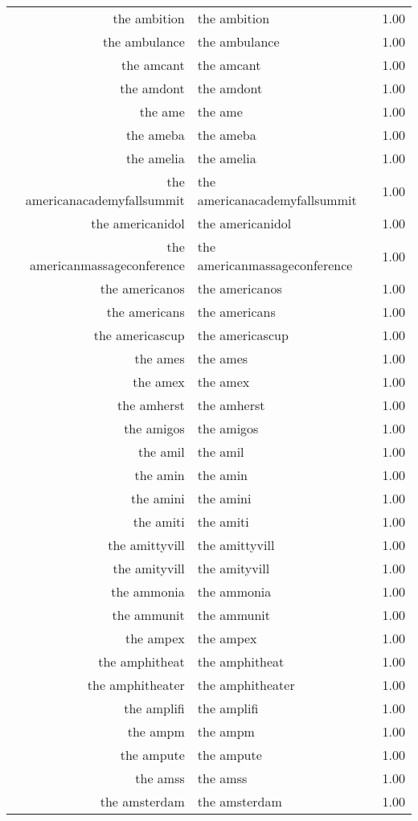 \begin{table}[ht]
\begin{tabular}{rlr}
  the ambition & the ambition & 1.00 \\ 
  the ambulance & the ambulance & 1.00 \\ 
  the amcant & the amcant & 1.00 \\ 
  the amdont & the amdont & 1.00 \\ 
  the ame & the ame & 1.00 \\ 
  the ameba & the ameba & 1.00 \\ 
  the amelia & the amelia & 1.00 \\ 
  the americanacademyfallsummit & the americanacademyfallsummit & 1.00 \\ 
  the americanidol & the americanidol & 1.00 \\ 
  the americanmassageconference & the americanmassageconference & 1.00 \\ 
  the americanos & the americanos & 1.00 \\ 
  the americans & the americans & 1.00 \\ 
  the americascup & the americascup & 1.00 \\ 
  the ames & the ames & 1.00 \\ 
  the amex & the amex & 1.00 \\ 
  the amherst & the amherst & 1.00 \\ 
  the amigos & the amigos & 1.00 \\ 
  the amil & the amil & 1.00 \\ 
  the amin & the amin & 1.00 \\ 
  the amini & the amini & 1.00 \\ 
  the amiti & the amiti & 1.00 \\ 
  the amittyvill & the amittyvill & 1.00 \\ 
  the amityvill & the amityvill & 1.00 \\ 
  the ammonia & the ammonia & 1.00 \\ 
  the ammunit & the ammunit & 1.00 \\ 
  the ampex & the ampex & 1.00 \\ 
  the amphitheat & the amphitheat & 1.00 \\ 
  the amphitheater & the amphitheater & 1.00 \\ 
  the amplifi & the amplifi & 1.00 \\ 
  the ampm & the ampm & 1.00 \\ 
  the ampute & the ampute & 1.00 \\ 
  the amss & the amss & 1.00 \\ 
  the amsterdam & the amsterdam & 1.00 \\ 

\end{tabular}
\end{table}
